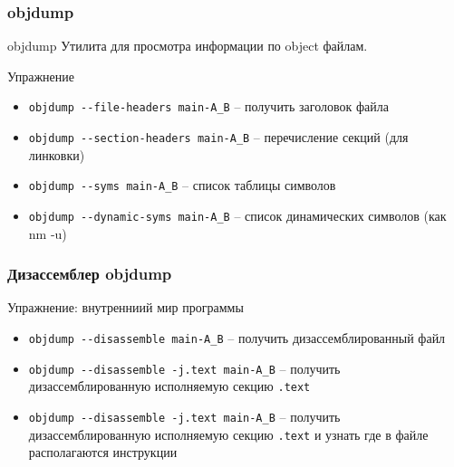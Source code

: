 
\begin{frame}
	\frametitle{objdump}

	\begin{block}{objdump}
		Утилита для просмотра информации по object файлам.
	\end{block}

	\pause

	\begin{block}{Упражнение}
		\begin{itemize}
			\item {\tt objdump -{}-file-headers main-A\_B} -- получить заголовок файла
			\item {\tt objdump -{}-section-headers main-A\_B} -- перечисление секций (для линковки)
			\item {\tt objdump -{}-syms main-A\_B} -- список таблицы символов
			\item {\tt objdump -{}-dynamic-syms main-A\_B} -- список динамических символов (как nm -u)
		\end{itemize}

	\end{block}
\end{frame}


\begin{frame}
	\frametitle{Дизассемблер objdump}

	\begin{block}{Упражнение: внутренниий мир программы}
		\begin{itemize}
			\item {\tt objdump -{}-disassemble main-A\_B} -- получить дизассемблированный файл
			\item {\tt objdump -{}-disassemble -j.text main-A\_B} -- 
				получить дизассемблированную исполняемую секцию {\tt .text}
			\item {\tt objdump -{}-disassemble -j.text main-A\_B} -- 
				получить дизассемблированную исполняемую секцию {\tt .text} 
				и узнать где в файле располагаются инструкции
		\end{itemize}
	\end{block}
\end{frame}

